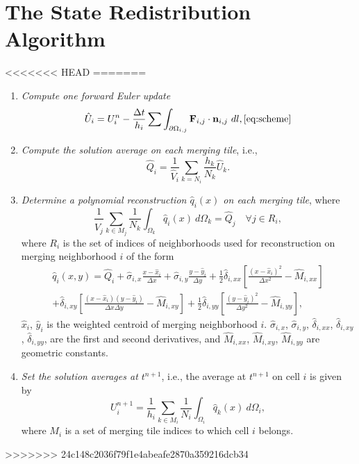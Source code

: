 \section{The State Redistribution Algorithm}\label{srdAlg}
<<<<<<< HEAD
=======
\begin{enumerate}[label=Step \arabic*:]
    \item \textit{Compute one forward Euler update}
    \begin{equation} 
    \hat{U}_i = U^n_i - \frac{\Delta t}{h_i}\sum \int_{\partial \Omega_{i,j}} \mathbf{F}_{i,j} \cdot \mathbf{n}_{i,j}~dl,\ref{eq:scheme}
    \end{equation}
	\item \textit{Compute the solution average on each merging tile}, i.e.,
	\begin{equation}\label{eq:q_avg1}
	    \hat Q_i =  \frac{1}{\hat V_i}\sum_{k = N_i}\frac{h_k}{N_k} \hat U_k.
	\end{equation}
\item \textit{Determine a polynomial reconstruction $\hat q_i(x)$ on each merging tile}, where
\begin{equation}\label{eq:qi}
\frac{1}{\hat V_j}\sum_{k \in M_j}\frac{1}{N_k}\int_{\Omega_k} \hat q_i(x)~d\Omega_k = \hat Q_j \quad \forall j \in R_i,
\end{equation}
where $R_i$ is the set of indices of neighborhoods used for reconstruction on merging neighborhood $i$ of the form
\begin{equation}\label{eq:q}
\begin{aligned}
	    \hat q_i(x,y) = \hat Q_{i} + \hat \sigma_{i,x}\frac{x-\hat x_i}{\Delta x} +  \hat \sigma_{i,y}\frac{y-\hat y_i}{\Delta y} + \frac{1}{2}\hat \delta_{i, xx}\left[ \frac{(x - \hat x_i)^2 }{\Delta x^2} - \hat M_{i,xx}\right]\\
	    +\hat \delta_{i, xy}\left[ \frac{(x - \hat x_i) (y - \hat y_i) }{\Delta x \Delta y} - \hat M_{i,xy}\right] + \frac{1}{2}\hat \delta_{i, yy}\left[ \frac{(y - \hat y_i)^2 }{\Delta y^2} -  \hat M_{i,yy}\right],
\end{aligned}
\end{equation}
$\hat x_i$, $\hat y_i$ is the weighted centroid of merging neighborhood $i$. $\hat \sigma_{i,x}$, $\hat \sigma_{i,y}$, $\hat \delta_{i,xx}$, $\hat \delta_{i,xy}$, $\hat \delta_{i,yy}$, are the first and second derivatives, and $ \hat M_{i,xx}$, $\hat M_{i,xy}$,  $\hat M_{i,yy}$ are geometric constants. 

\item \textit{Set the solution averages at $t^{n+1}$}, i.e., the average at $t^{n+1}$ on cell $i$ is given by
	\begin{equation}\label{eq:final_update}
	U^{n+1}_i =  \frac{1}{h_i}\sum_{k \in M_{i}}\frac{1}{N_i}\int_{\Omega_i} \hat q_k(x)~d\Omega_i,
	\end{equation}
	where $M_i$ is a set of merging tile indices to which cell $i$ belongs.
\end{enumerate}

	
>>>>>>> 24c148c2036f79f1e4abeafe2870a359216dcb34
